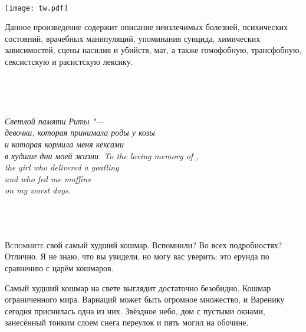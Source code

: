 \newpage\thispagestyle{plain}
{~\par}
\vfill
{\centering\texttt{[image: tw.pdf]}\par}
\vspace{1em}
{\centering\Large{}\par}
\vspace{0.5em}
{\centering\large{Данное произведение содержит описание неизлечимых болезней, психических состояний, врачебных манипуляций, упоминания суицида, химических зависимостей, сцены насилия и убийств, мат, а также гомофобную, трансфобную, сексистскую и расистскую лексику.}\par}
\vfill
{~\par}

\tableofcontents

\newpage\thispagestyle{plain}
{~\par}
\vfill
{\centering\Large\textit{
{Светлой памяти Риты "---\\девочки, которая принимала роды у козы\\и которая кормила меня кексами\\в худшие дни моей жизни.}
{To the loving memory of \Rita,\\the girl who delivered a goatling\\and who fed me muffins\\on my worst days.}
}\par}
\vfill
{~\par}

\pagestyle{fancy}

\chapter{}

\label{Mon_2012_04_09}

\lettrine[lines=4,slope=0pt,nindent=3pt]{В}{спомните} свой самый худший кошмар.
Вспомнили?
Во всех подробностях?
Отлично.
Я не знаю, что вы увидели, но могу вас уверить: это ерунда по сравнению с царём кошмаров.

Самый худший кошмар на свете выглядит достаточно безобидно.
Кошмар ограниченного мира.
Вариаций может быть огромное множество, и Варенику сегодня приснилась одна из них.
Звёздное небо, дом с пустыми окнами, занесённый тонким слоем снега переулок и пять могил на обочине.

